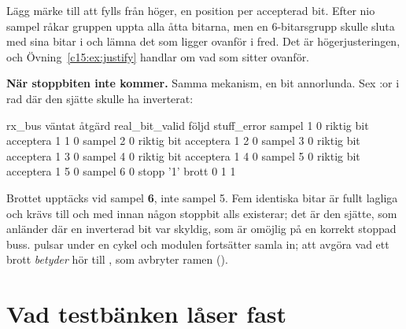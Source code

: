 Lägg märke till att  fylls från höger, en position per accepterad bit. Efter nio sampel
råkar gruppen uppta alla åtta bitarna, men en 6-bitarsgrupp skulle sluta med sina bitar i
 och lämna det som ligger ovanför i fred. Det är högerjusteringen, och
Övning~\ref{c15:ex:justify} handlar om vad som sitter ovanför.

\textbf{När stoppbiten inte kommer.} Samma mekanism, en bit annorlunda. Sex :or i rad där
den sjätte skulle ha inverterat:

\begin{textdrawing}
            rx_bus      väntat     åtgärd  real_bit_valid  följd  stuff_error
sampel 1         0  riktig bit  acceptera               1     1            0
sampel 2         0  riktig bit  acceptera               1     2            0
sampel 3         0  riktig bit  acceptera               1     3            0
sampel 4         0  riktig bit  acceptera               1     4            0
sampel 5         0  riktig bit  acceptera               1     5            0
sampel 6         0   stopp '1'      brott               0     1            1
\end{textdrawing}

Brottet upptäcks vid sampel \textbf{6}, inte sampel 5. Fem identiska bitar är fullt lagliga och krävs
till och med innan någon stoppbit alls existerar; det är den sjätte, som anländer där en inverterad
bit var skyldig, som är omöjlig på en korrekt stoppad buss.  pulsar under en cykel
och modulen fortsätter samla in; att avgöra vad ett brott \emph{betyder} hör till
, som avbryter ramen ().

\section{Vad testbänken låser fast}
\label{c15:sec:tb}

